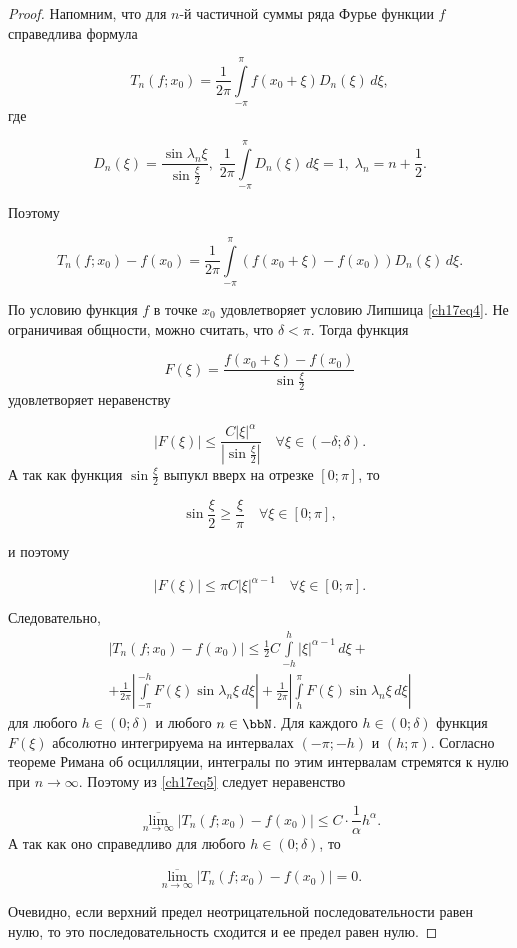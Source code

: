 \begin{proof}
Напомним, что для $n$-й частичной суммы ряда Фурье функции $f$ справедлива формула

$$
T_n(f;x_0) = \frac{1}{2\pi} \int\limits_{-\pi}^{\pi} f(x_0 + \xi) D_n(\xi) \,d\xi,
$$
где

$$
D_n(\xi) = \frac{\sin{\lambda_n \xi}}{\sin{\frac{\xi}{2}}}, \; \frac{1}{2\pi}\int\limits_{-\pi}^{\pi} D_n(\xi) \,d\xi = 1, \; \lambda_n = n + \frac12.
$$

Поэтому 

$$
T_n(f; x_0) - f(x_0) = \frac{1}{2\pi}\int\limits_{-\pi}^{\pi}(f(x_0 + \xi) - f(x_0))D_n(\xi)\,d\xi.
$$

По условию функция $f$ в точке $x_0$ удовлетворяет условию Липшица \eqref{ch17eq4}. Не ограничивая общности, можно считать, что $\delta < \pi$. Тогда функция 

$$
F(\xi) = \frac{f(x_0 + \xi) - f(x_0)}{\sin{\frac{\xi}{2}}}
$$
удовлетворяет неравенству

$$
|F(\xi)| \le \frac{C|\xi|^\alpha}{\left| \sin{\frac{\xi}{2}} \right|} \quad \forall \xi \in (-\delta; \delta).
$$
А так как функция $\sin{\frac{\xi}{2}}$ выпукл вверх на отрезке $[0; \pi]$, то

$$
\sin{\frac{\xi}{2}} \ge \frac{\xi}{\pi} \quad \forall \xi \in [0; \pi],
$$

и поэтому 

$$
|F(\xi)| \le \pi C |\xi|^{\alpha - 1} \quad \forall \xi \in [0; \pi].
$$

Следовательно,
\begin{multline} \label{ch17eq5}
|T_n(f; x_0) - f(x_0)| \le \frac{1}{2} C \int\limits_{-h}^{h} |\xi|^{\alpha - 1}\,d\xi + \\
+ \frac{1}{2\pi} \left| \int\limits_{-\pi}^{-h} F(\xi) \sin{\lambda_n \xi} \,d\xi \right| + \frac{1}{2\pi} \left| \int\limits_{h}^{\pi} F(\xi) \sin{\lambda_n \xi} \,d\xi \right|
\end{multline}
для любого $h \in (0; \delta)$ и любого $n \in \bbN$. Для каждого $h \in (0;\delta)$ функция $F(\xi)$ абсолютно интегрируема на интервалах $(-\pi; -h)$ и $(h; \pi)$. Согласно теореме Римана об осцилляции, интегралы по этим интервалам стремятся к нулю при $n \to \infty$. Поэтому из \eqref{ch17eq5} следует неравенство

$$
\overline{\lim\limits_{n \to \infty}}|T_n(f; x_0) - f(x_0)| \le C \cdot \frac{1}{\alpha}h^{\alpha}.
$$
А так как оно справедливо для любого $h \in (0; \delta)$, то 

$$
\overline{\lim\limits_{n \to \infty}}|T_n(f; x_0) - f(x_0)| = 0.
$$

Очевидно, если верхний предел неотрицательной последовательности равен нулю, то это последовательность сходится и ее предел равен нулю.
\end{proof}

